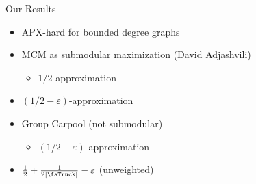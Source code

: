 \begin{frame}[<+->]{Our Results}
\begin{itemize}
  	\item APX-hard for bounded degree graphs 
	\item MCM as submodular maximization (David Adjashvili) 
		\begin{itemize}
		  \item $1/2$-approximation 
		\end{itemize}
	\item $(1/2 - \varepsilon)$-approximation 
	\item Group Carpool (not submodular)
		\begin{itemize}
			\item $(1/2 - \varepsilon)$-approximation
		\end{itemize}
	\item $\frac{1}{2} + \frac{1}{2|\text{\faTruck}|} - \varepsilon$ (unweighted)
\end{itemize}
\end{frame}
